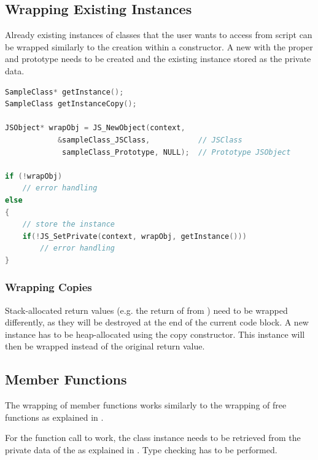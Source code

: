 \subsection{Wrapping Existing Instances}

Already existing instances of  classes that the user wants to access from script can be wrapped similarly to the creation within a constructor. A new  with the proper  and prototype needs to be created and the existing instance stored as the private data.

\SingleSpacing
\begin{lstlisting}[language=C++, caption=Wrapping an instance, label=lst:WrappingInstance]
SampleClass* getInstance();
SampleClass getInstanceCopy();

JSObject* wrapObj = JS_NewObject(context, 
			&sampleClass_JSClass,           // JSClass
			 sampleClass_Prototype, NULL);  // Prototype JSObject
			 
if (!wrapObj)
	// error handling
else
{
	// store the instance
	if(!JS_SetPrivate(context, wrapObj, getInstance()))
		// error handling
}

\end{lstlisting}
\OnehalfSpacing

\subsubsection{Wrapping Copies}
\label{sec:WrappingCopies}

Stack-allocated return values (e.g. the return of  from ) need to be wrapped differently, as they will be destroyed at the end of the current code block. A new instance has to be heap-allocated using the copy constructor. This instance will then be wrapped instead of the original return value.

\subsection{Member Functions}

The wrapping of member functions works similarly to the wrapping of free functions as explained in .

For the function call to work, the class instance needs to be retrieved from the private data of the   as explained in . Type checking has to be performed.

